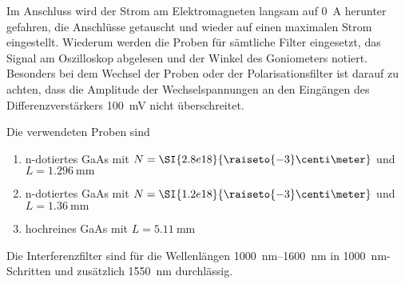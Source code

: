 Im Anschluss wird der Strom am Elektromagneten langsam auf \SI{0}{\ampere}
herunter gefahren, die Anschlüsse getauscht und wieder auf einen maximalen
Strom eingestellt. Wiederum werden die Proben für sämtliche Filter
eingesetzt, das Signal am Oszilloskop abgelesen und der Winkel des
Goniometers notiert.
Besonders bei dem Wechsel der Proben oder der Polarisationsfilter
ist darauf zu achten, dass die Amplitude der Wechselspannungen an den
Eingängen des Differenzverstärkers \SI{100}{\milli\volt} nicht
überschreitet.

Die verwendeten Proben sind
\begin{enumerate}
  \item n-dotiertes GaAs mit
  $N = \SI{2.8e18}{\raiseto{-3}\centi\meter}$ und
  $L = \SI{1.296}{\milli\meter}$
  \item n-dotiertes GaAs mit
  $N = \SI{1.2e18}{\raiseto{-3}\centi\meter}$ und
  $L = \SI{1.36}{\milli\meter}$
  \item hochreines GaAs mit
  $L = \SI{5.11}{\milli\meter}$
\end{enumerate}
Die Interferenzfilter sind für die Wellenlängen
\SIrange{1000}{1600}{\nano\meter} in \SI{1000}{\nano\meter}-Schritten
und zusätzlich \SI{1550}{\nano\meter} durchlässig.